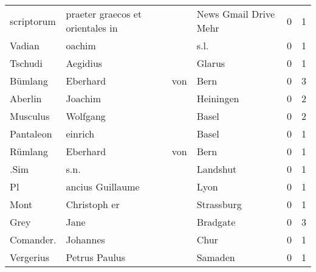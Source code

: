 \begin{tabular}{llllrr}
               scriptorum &   praeter graecos et orientales in &             &                       News Gmail Drive Mehr &          0 &         1 \\
                   Vadian &                             oachim &             &                                        s.l. &          0 &         1 \\
                  Tschudi &                           Aegidius &             &                                      Glarus &          0 &         1 \\
                  Bümlang &                           Eberhard &         von &                                        Bern &          0 &         3 \\
                  Aberlin &                            Joachim &             &                                   Heiningen &          0 &         2 \\
                 Musculus &                           Wolfgang &             &                                       Basel &          0 &         2 \\
                Pantaleon &                            einrich &             &                                       Basel &          0 &         1 \\
                  Rümlang &                           Eberhard &         von &                                        Bern &          0 &         1 \\
                     .Sim &                               s.n. &             &                                    Landshut &          0 &         1 \\
                       Pl &                   ancius Guillaume &             &                                        Lyon &          0 &         1 \\
                     Mont &                       Christoph er &             &                                  Strassburg &          0 &         1 \\
                     Grey &                               Jane &             &                                    Bradgate &          0 &         3 \\
                Comander. &                           Johannes &             &                                        Chur &          0 &         1 \\
                Vergerius &                      Petrus Paulus &             &                                     Samaden &          0 &         1 \\

\end{tabular}
